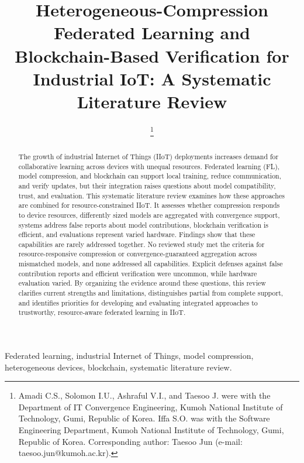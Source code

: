 \documentclass[journal]{IEEEtran}
\begin{document}
\title{Heterogeneous-Compression Federated Learning and Blockchain-Based Verification for Industrial IoT: A Systematic Literature Review}

\author{
\thanks{Amadi C.S., Solomon I.U., Ashraful V.I., and Taesoo J. were with the Department of IT Convergence Engineering, Kumoh National Institute of Technology, Gumi, Republic of Korea. Iffa S.O. was with the Software Engineering Department, Kumoh National Institute of Technology, Gumi, Republic of Korea. Corresponding author: Taesoo Jun (e-mail: taesoo.jun@kumoh.ac.kr).}
}

\maketitle

\begin{abstract}
The growth of industrial Internet of Things (IIoT) deployments increases demand for collaborative learning across devices with unequal resources. Federated learning (FL), model compression, and blockchain can support local training, reduce communication, and verify updates, but their integration raises questions about model compatibility, trust, and evaluation. This systematic literature review examines how these approaches are combined for resource-constrained IIoT. It assesses whether compression responds to device resources, differently sized models are aggregated with convergence support, systems address false reports about model contributions, blockchain verification is efficient, and evaluations represent varied hardware. Findings show that these capabilities are rarely addressed together. No reviewed study met the criteria for resource-responsive compression or convergence-guaranteed aggregation across mismatched models, and none addressed all capabilities. Explicit defenses against false contribution reports and efficient verification were uncommon, while hardware evaluation varied. By organizing the evidence around these questions, this review clarifies current strengths and limitations, distinguishes partial from complete support, and identifies priorities for developing and evaluating integrated approaches to trustworthy, resource-aware federated learning in IIoT.
\end{abstract}

\begin{IEEEkeywords}
Federated learning, industrial Internet of Things, model compression, heterogeneous devices, blockchain, systematic literature review.
\end{IEEEkeywords}
\end{document}
